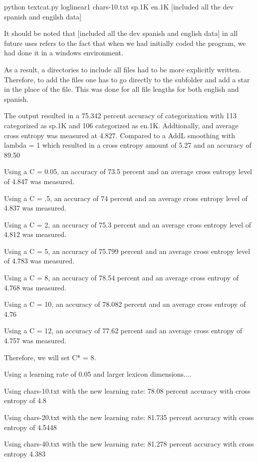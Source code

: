 \documentclass[12pt, letterpaper]{article}
\begin{document}
python textcat.py loglinear1 chars-10.txt sp.1K en.1K  [included all the dev spanish and engilsh data]

It should be noted that [included all the dev spanish and english data] in all future uses refers to the fact that when we had initially coded the program, we had done it in a windows environment. 

As a result, a directories to include all files had to be more explicitly written. Therefore, to add the files one has to go directly to the subfolder and add a star in the place of the file. This was done for all file lengths for both english and spanish. 

The output resulted in a 75.342 percent accuracy of categorization with 113 categorized as sp.1K and 106 categorized as en.1K. Addtionally, and average cross entropy was measured at 4.827. Compared to a AddL smoothing with lambda = 1 which resulted in a cross entropy amount of 5.27 and an accuracy of 89.50%

Using a C = 0.05, an accuracy of 73.5 percent and an average cross entropy level of 4.847 was measured. 

Using a C = .5, an accuracy of 74 percent and an average cross entropy level of 4.837 was measured.

Using a C = 2, an accuracy of 75.3 percent and an average cross entropy level of 4.812 was measured.

Using a C = 5, an accuracy of 75.799 percent and an average cross entropy level of 4.783 was measured.

Using a C = 8, an accuracy of 78.54 percent and an average cross entropy of 4.768 was measured.

Using a C = 10, an accuracy of  78.082 percent and an average cross entropy of 4.76

Using a C = 12, an accuracy of 77.62 percent and an average cross entropy of 4.757 was measured.

Therefore, we will set C* = 8.



Using a learning rate of 0.05 and larger lexicon dimensions....

Using chars-10.txt with the new learning rate: 78.08 percent accuracy with cross entropy of 4.8

Using chars-20.txt with the new learning rate: 81.735 percent accuracy with cross entropy of 4.5448

Using chars-40.txt with the new learning rate: 81.278 percent accuracy with cross entropy 4.383
\end{document}
